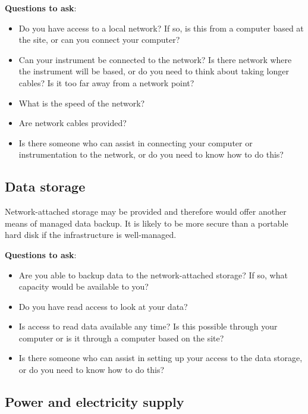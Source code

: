 \documentclass[a4paper,oneside]{report}
\providecommand{\tightlist}{%
  \setlength{\itemsep}{0pt}\setlength{\parskip}{0pt}}
\begin{document}
\textbf{Questions to ask}:

\begin{itemize}
\tightlist
\item
  Do you have access to a local network? If so, is this from a computer
  based at the site, or can you connect your computer?
\item
  Can your instrument be connected to the network? Is there network
  where the instrument will be based, or do you need to think about
  taking longer cables? Is it too far away from a network point?
\item
  What is the speed of the network?
\item
  Are network cables provided?
\item
  Is there someone who can assist in connecting your computer or
  instrumentation to the network, or do you need to know how to do this?
\end{itemize}

\hypertarget{data-storage}{%
\subsection{Data storage}\label{data-storage}}

Network-attached storage may be provided and therefore would offer
another means of managed data backup. It is likely to be more secure
than a portable hard disk if the infrastructure is well-managed.

\textbf{Questions to ask}:

\begin{itemize}
\tightlist
\item
  Are you able to backup data to the network-attached storage? If so,
  what capacity would be available to you?
\item
  Do you have read access to look at your data?
\item
  Is access to read data available any time? Is this possible through
  your computer or is it through a computer based on the site?
\item
  Is there someone who can assist in setting up your access to the data
  storage, or do you need to know how to do this?
\end{itemize}

\hypertarget{power-and-electricity-supply}{%
\subsection{Power and electricity
supply}\label{power-and-electricity-supply}}
\end{document}
